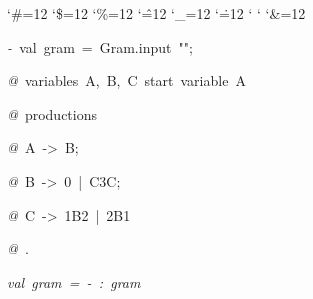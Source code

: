 \begin{list}{}
{\setlength{\leftmargin}{\leftmargini}
\setlength{\rightmargin}{0cm}
\setlength{\itemindent}{0cm}
\setlength{\listparindent}{0cm}
\setlength{\itemsep}{0cm}
\setlength{\parsep}{0cm}
\setlength{\labelsep}{0cm}
\setlength{\labelwidth}{0cm}
\catcode`\#=12
\catcode`\$=12
\catcode`\%=12
\catcode`\^=12
\catcode`\_=12
\catcode`\.=12
\catcode`
\catcode`
\catcode`\&=12
\ttfamily}
\small
\item[]\textsl{-\ }val\ gram\ =\ Gram.input\ "";
\item[]\textsl{@\ }variables\ A,\ B,\ C\ start\ variable\ A
\item[]\textsl{@\ }productions
\item[]\textsl{@\ }A\ ->\ B;
\item[]\textsl{@\ }B\ ->\ 0\ |\ C3C;
\item[]\textsl{@\ }C\ ->\ 1B2\ |\ 2B1
\item[]\textsl{@\ }.
\item[]\textsl{val\ gram\ =\ -\ :\ gram}
\end{list}

